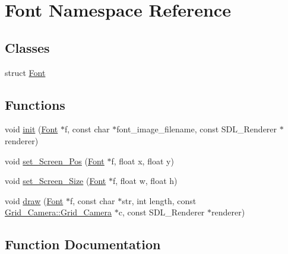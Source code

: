 \hypertarget{namespace_font}{}\section{Font Namespace Reference}
\label{namespace_font}
\subsection*{Classes}
\begin{DoxyCompactItemize}
\item 
struct \mbox{\hyperlink{struct_font_1_1_font}{Font}}
\end{DoxyCompactItemize}
\subsection*{Functions}
\begin{DoxyCompactItemize}
\item 
void \mbox{\hyperlink{namespace_font_af6ab17f036035c118e97b51c03a90926}{init}} (\mbox{\hyperlink{struct_font_1_1_font}{Font}} $\ast$f, const char $\ast$font\+\_\+image\+\_\+filename, const S\+D\+L\+\_\+\+Renderer $\ast$renderer)
\item 
void \mbox{\hyperlink{namespace_font_a872717bb42284aaaf8cce742f25d675e}{set\+\_\+\+Screen\+\_\+\+Pos}} (\mbox{\hyperlink{struct_font_1_1_font}{Font}} $\ast$f, float x, float y)
\item 
void \mbox{\hyperlink{namespace_font_a1045d7bc4b1e4678b8277dad135af8ff}{set\+\_\+\+Screen\+\_\+\+Size}} (\mbox{\hyperlink{struct_font_1_1_font}{Font}} $\ast$f, float w, float h)
\item 
void \mbox{\hyperlink{namespace_font_a16fc4e305250f3c5bdfc383533ec80d6}{draw}} (\mbox{\hyperlink{struct_font_1_1_font}{Font}} $\ast$f, const char $\ast$str, int length, const \mbox{\hyperlink{struct_grid___camera_1_1_grid___camera}{Grid\+\_\+\+Camera\+::\+Grid\+\_\+\+Camera}} $\ast$c, const S\+D\+L\+\_\+\+Renderer $\ast$renderer)
\end{DoxyCompactItemize}


\subsection{Function Documentation}
\mbox{\label{namespace_font_a16fc4e305250f3c5bdfc383533ec80d6}} 
